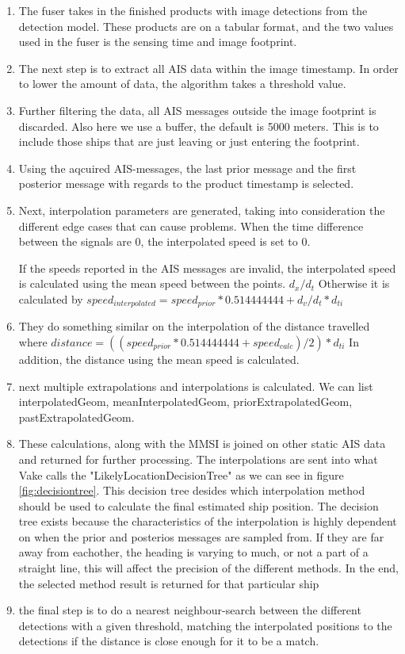 \begin{enumerate}
	\item The fuser takes in the finished products with image detections from the detection model. These products are on a tabular format, and the two values used in the fuser is the sensing time and image footprint. 
	\item The next step is to extract all AIS data within the image timestamp. In order to lower the amount of data, the algorithm takes a threshold value. 
	\item Further filtering the data, all AIS messages outside the image footprint is discarded. Also here we use a buffer, the default is 5000 meters. This is to include those ships that are just leaving or just entering the footprint. 
	\item Using the aqcuired AIS-messages, the last prior message and the first posterior message with regards to the product timestamp is selected. 
	\item Next, interpolation parameters are generated, taking into consideration the different edge cases that can cause problems. When the time difference between the signals are 0, the interpolated speed is set to 0.
	
	If the speeds reported in the AIS messages are invalid, the interpolated speed is calculated using the mean speed between the points. $d_x/d_t$ Otherwise it is calculated by $speed_{interpolated} = speed_{prior}*0.514444444 + d_v/d_t * d_{ti}$

	\item They do something similar on the interpolation of the distance travelled where $distance=((speed_{prior}*0.514444444 + speed_{calc})/2)*d_{ti}$ 
	In addition, the distance using the mean speed is calculated.
	
	\item next multiple extrapolations and interpolations is calculated. We can list interpolatedGeom, meanInterpolatedGeom, priorExtrapolatedGeom,  pastExtrapolatedGeom. 
	\item These calculations, along with the MMSI is joined on other static AIS data and returned for further processing. The interpolations are sent into what Vake calls the "LikelyLocationDecisionTree" as we can see in figure \ref{fig:decisiontree}. This decision tree desides which interpolation method should be used to calculate the final estimated ship position. The decision tree exists because the characteristics of the interpolation is highly dependent on when the prior and posterios messages are sampled from. If they are far away from eachother, the heading is varying to much, or not a part of a straight line, this will affect the precision of the different methods. In the end, the selected method result is returned for that particular ship
	\item the final step is to do a nearest neighbour-search between the different detections with a given threshold, matching the interpolated positions to the detections if the distance is close enough for it to be a match.   
\end{enumerate}	

